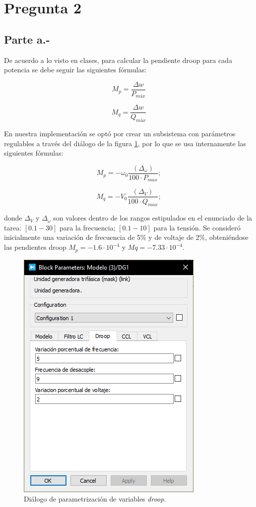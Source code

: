 \section{Pregunta 2}

\subsection{Parte a.-}

De acuerdo a lo visto en clases, para calcular la pendiente droop para cada potencia se debe seguir las siguientes fórmulas:

\begin{equation}
    M_p = \frac{\Delta w}{P_{máx}}
\end{equation}

\begin{equation}
    M_q = \frac{\Delta w}{Q_{máx}}
\end{equation}

En nuestra implementación se optó por crear un subsistema con parámetros regulables a través del diálogo de la figura \ref{dialogo_dg}, por lo que se usa internamente las siguientes fórmulas:

\begin{equation*}    
M_p = -\omega_0\frac{(\Delta_\omega)}{100\cdot P_{max}};
\end{equation*}

\begin{equation*}
M_q = -V_0\frac{(\Delta_V)}{100\cdot Q_{max}};
    
\end{equation*}

donde $\Delta_V$ y $\Delta_\omega$ son valores dentro de los rangos estipulados en el enunciado de la tarea: $[0.1 - 30]$ para la frecuencia; $[0.1 - 10]$ para la tensión. Se consideró inicialmente una variación de frecuencia de 5\% y de voltaje de 2\%, obteniéndose las pendientes droop $M_p = -1.6\cdot 10^{-4}$ y $ Mq = -7.33 \cdot 10^{-4}$.\\

\begin{figure}
   \centering
   \includegraphics[width=0.5\linewidth]{Tarea 1/report/imagenes/p2a/dialogo_dg.png}
   \caption{Diálogo de parametrización de variables \textit{droop}.}
   \label{dialogo_dg}
\end{figure}

